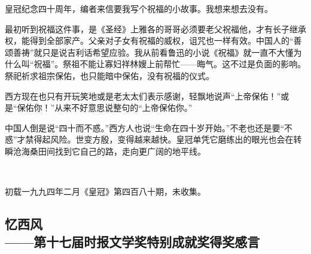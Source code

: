 \par 皇冠纪念四十周年，编者来信要我写个祝福的小故事。我想来想去没有。
\par 最初听到祝福这件事，是《圣经》上雅各的哥哥必须要老父祝福他，才有长子继承权，能得到全部家产。父亲对子女有祝福的威权，诅咒也一样有效。中国人的“善颂善祷”就只是说吉利话希望应验。我从前看鲁迅的小说《祝福》就一直不大懂为什么叫“祝福”。祭祖不能让寡妇祥林嫂上前帮忙——晦气。这不过是负面的影响。祭祀祈求祖宗保佑，也只能暗中保佑，没有祝福的仪式。
\par 西方现在也只有开玩笑地或是老太太们表示感谢，轻飘地说声“上帝保佑！”或是“保佑你！”从来不好意思说整句的“上帝保佑你。”
\par 中国人倒是说“四十而不惑。”西方人也说“生命在四十岁开始。”不老也还是要“不惑”才禁得起风险。世变方殷，变得越来越快。皇冠单凭它磨练出的眼光也会在转瞬沧海桑田间找到它自己的路，走向更广阔的地平线。
\par  
\par *初载一九九四年二月《皇冠》第四百八十期，未收集。



\subsection{忆西风\\\small{——第十七届时报文学奖特别成就奖得奖感言}}

